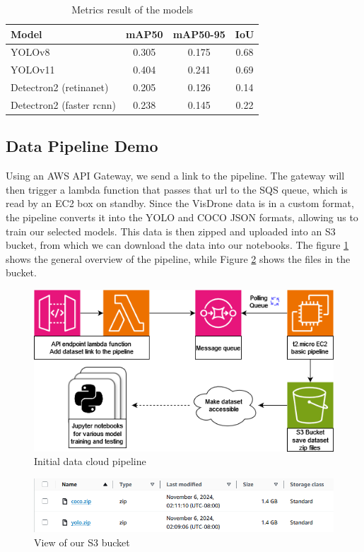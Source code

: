 \documentclass[stu,12pt,floatsintext]{apa7}
\begin{document}
\begin{table}[!htb]
	\centering
	\begin{tabular}{lccc}
		\hline
		Model                    & mAP50 & mAP50-95 & IoU  \\
		\hline
		YOLOv8                   & 0.305 & 0.175    & 0.68 \\
		YOLOv11                  & 0.404 & 0.241    & 0.69 \\
		Detectron2 (retinanet)   & 0.205 & 0.126    & 0.14 \\
		Detectron2 (faster rcnn) & 0.238 & 0.145    & 0.22 \\
		\hline
	\end{tabular}
	\caption{Metrics result of the models}
	\label{tab:results}
\end{table}

\subsection{Data Pipeline Demo}

Using an AWS API Gateway, we send a link to the  pipeline. The gateway will then trigger a lambda function that passes that url to the SQS queue, which is read by an EC2 box on standby. Since the VisDrone data is in a custom format, the pipeline converts it into the YOLO and COCO JSON formats, allowing us to train our selected models. This data is then zipped and uploaded into an S3 bucket, from which we can download the data into our notebooks. The figure \ref{fig:aws-pipeline} shows the general overview of the pipeline, while Figure \ref{fig:s3} shows the files in the bucket.

\begin{figure}[!htb]
	\centering
	\includegraphics[width=0.5\linewidth]{images/AWS_diagram.png}
	\caption{Initial data cloud pipeline}
	\label{fig:aws-pipeline}
\end{figure}

\begin{figure}[!htb]
	\centering
	\includegraphics[width=0.75\linewidth]{images/s3_bucket.png}
	\caption{View of our S3 bucket}
	\label{fig:s3}
\end{figure}
\end{document}
